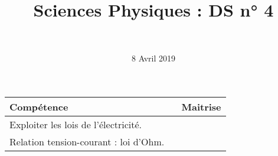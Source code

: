 \documentclass[a4paper,11pt]{exam}
\author{\ }
\date{8 Avril 2019}
\title{Sciences Physiques : DS n° 4}
\begin{document}
%	

	\maketitle
	
\begin{small}
	\begin{center}
		\begin{tabular}{|@{\ }l@{}|@{\ }c@{\ }|}
			\hline
			\textbf{Compétence} & \textbf{Maitrise} \\
			\hline
		Exploiter les lois de l’électricité. \ \ &  \ \ \ \\
			\hline
			Relation tension-courant : loi d’Ohm. \ &  \\
			\hline
		\end{tabular}
	\end{center}
\end{small}	
	
	



%
%
%

%






%






















 
%
\ \label{LastPage}
\end{document}

